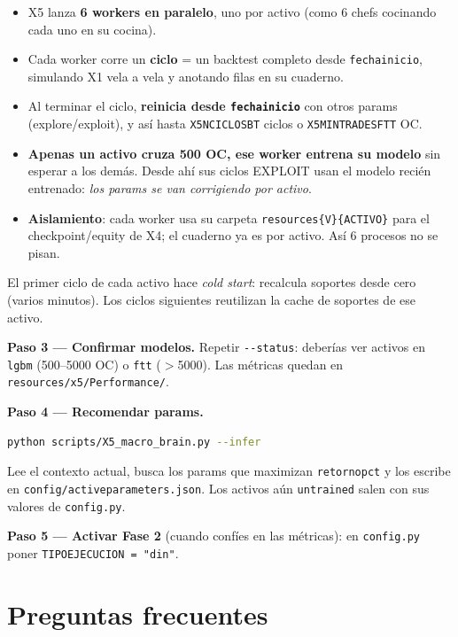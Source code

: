 \documentclass[11pt,a4paper]{report}
\newcommand{\code}[1]{\texttt{\def\_{\textunderscore\allowbreak}#1}}
\begin{document}
\begin{itemize}[leftmargin=1.4em, itemsep=1pt]
  \item X5 lanza \textbf{6 workers en paralelo}, uno por activo (como 6 chefs cocinando cada uno
  en su cocina).
  \item Cada worker corre un \textbf{ciclo} = un backtest completo desde \code{fecha\_inicio},
  simulando X1 vela a vela y anotando filas en su cuaderno.
  \item Al terminar el ciclo, \textbf{reinicia desde \code{fecha\_inicio}} con otros params
  (explore/exploit), y así hasta \code{X5\_N\_CICLOS\_BT} ciclos o \code{X5\_MIN\_TRADES\_FTT} OC.
  \item \textbf{Apenas un activo cruza 500 OC, ese worker entrena su modelo} sin esperar a los
  demás. Desde ahí sus ciclos EXPLOIT usan el modelo recién entrenado: \emph{los params se van
  corrigiendo por activo}.
  \item \textbf{Aislamiento}: cada worker usa su carpeta \code{resources\_\{V\}\_\{ACTIVO\}} para el
  checkpoint/equity de X4; el cuaderno ya es por activo. Así 6 procesos no se pisan.
\end{itemize}

\begin{nota}
El primer ciclo de cada activo hace \emph{cold start}: recalcula soportes desde cero (varios
minutos). Los ciclos siguientes reutilizan la cache de soportes de ese activo.
\end{nota}

\textbf{Paso 3 — Confirmar modelos.} Repetir \code{-{}-status}: deberías ver activos en
\code{lgbm} (500--5000 OC) o \code{ftt} ($>$5000). Las métricas quedan en
\code{resources/x5/Performance/}.

\textbf{Paso 4 — Recomendar params.}
\begin{lstlisting}[language=bash]
python scripts/X5_macro_brain.py --infer
\end{lstlisting}
Lee el contexto actual, busca los params que maximizan \code{retorno\_pct} y los escribe en
\code{config/active\_parameters.json}. Los activos aún \code{untrained} salen con sus valores de
\code{config.py}.

\textbf{Paso 5 — Activar Fase 2} (cuando confíes en las métricas): en \code{config.py} poner
\code{TIPO\_EJECUCION = "din"}.

\section{Preguntas frecuentes}
\end{document}
